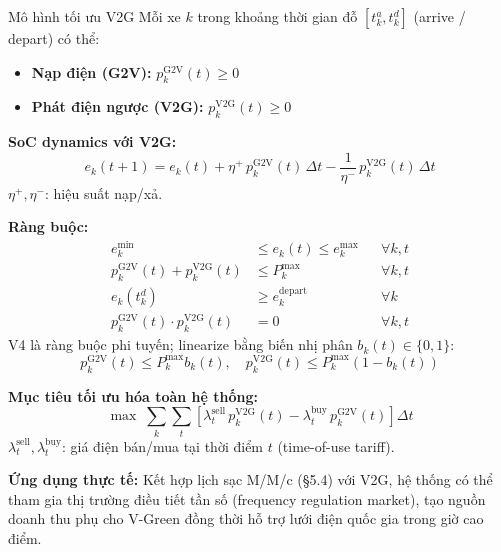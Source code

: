 \documentclass[12pt,a4paper]{article}
\begin{document}
\begin{evbox}{Mô hình tối ưu V2G}
Mỗi xe $k$ trong khoảng thời gian đỗ $[t^a_k, t^d_k]$ (arrive / depart) có thể:
\begin{itemize}
  \item \textbf{Nạp điện (G2V):} $p_k^{\mathrm{G2V}}(t) \geq 0$
  \item \textbf{Phát điện ngược (V2G):} $p_k^{\mathrm{V2G}}(t) \geq 0$
\end{itemize}

\textbf{SoC dynamics với V2G:}
\begin{equation}
  e_k(t+1) = e_k(t) + \eta^+\, p_k^{\mathrm{G2V}}(t)\,\Delta t
              - \frac{1}{\eta^-}\,p_k^{\mathrm{V2G}}(t)\,\Delta t
\end{equation}
$\eta^+, \eta^-$: hiệu suất nạp/xả.

\textbf{Ràng buộc:}
\begin{align}
  e_k^{\min} &\leq e_k(t) \leq e_k^{\max} &&\forall k,t \tag{V1: SoC bounds}\\
  p_k^{\mathrm{G2V}}(t) + p_k^{\mathrm{V2G}}(t) &\leq P_k^{\max} &&\forall k,t \tag{V2: Power limit}\\
  e_k(t^d_k) &\geq e_k^{\mathrm{depart}} &&\forall k \tag{V3: Departure SoC}\\
  p_k^{\mathrm{G2V}}(t)\cdot p_k^{\mathrm{V2G}}(t) &= 0 &&\forall k,t \tag{V4: No simultaneous}
\end{align}
V4 là ràng buộc phi tuyến; linearize bằng biến nhị phân $b_k(t)\in\{0,1\}$:
\begin{equation}
  p_k^{\mathrm{G2V}}(t) \leq P_k^{\max} b_k(t),\quad
  p_k^{\mathrm{V2G}}(t) \leq P_k^{\max}(1-b_k(t))
\end{equation}

\textbf{Mục tiêu tối ưu hóa toàn hệ thống:}
\begin{equation}
  \max\;\sum_k\sum_t\left[
    \lambda_t^{\mathrm{sell}}\,p_k^{\mathrm{V2G}}(t)
    - \lambda_t^{\mathrm{buy}}\,p_k^{\mathrm{G2V}}(t)
  \right]\Delta t
\end{equation}
$\lambda_t^{\mathrm{sell}}, \lambda_t^{\mathrm{buy}}$: giá điện bán/mua tại thời điểm $t$ (time-of-use tariff).
\end{evbox}

\textbf{Ứng dụng thực tế:} Kết hợp lịch sạc M/M/c (§5.4) với V2G, hệ thống
có thể tham gia thị trường điều tiết tần số (frequency regulation market),
tạo nguồn doanh thu phụ cho V-Green đồng thời hỗ trợ lưới điện quốc gia
trong giờ cao điểm.
\end{document}
